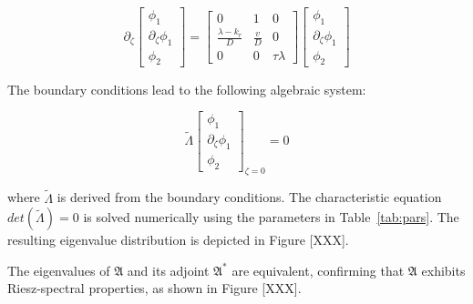 \begin{equation} \label{eq:eigval_calc_2}
    \partial_\zeta \begin{bmatrix}
        \phi_1 \\ \partial_\zeta \phi_1 \\ \phi_2
    \end{bmatrix} = \begin{bmatrix}
        0 & 1 & 0 \\
        \frac{\lambda-k_r}{D} & \frac{v}{D} & 0 \\
        0 & 0 & \tau \lambda 
    \end{bmatrix} \begin{bmatrix}
        \phi_1 \\ \partial_\zeta \phi_1 \\ \phi_2
    \end{bmatrix}
\end{equation}

The boundary conditions lead to the following algebraic system:

\begin{equation} \label{eq:eigval_calc_4}
    \tilde{\Lambda} \begin{bmatrix}
        \phi_1 \\ \partial_\zeta \phi_1 \\ \phi_2
    \end{bmatrix}_{\zeta=0} = 0
\end{equation}

where $\tilde{\Lambda}$ is derived from the boundary conditions. The characteristic equation $det(\tilde{\Lambda}) = 0$ is solved numerically using the parameters in Table~\ref{tab:pars}. The resulting eigenvalue distribution is depicted in Figure [XXX].

The eigenvalues of $\mathfrak{A}$ and its adjoint $\mathfrak{A}^*$ are equivalent, confirming that $\mathfrak{A}$ exhibits Riesz-spectral properties, as shown in Figure [XXX].

